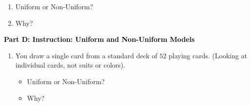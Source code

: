 \documentclass[12pt, letterpaper, fleqn]{article}
\newcommand{\blank}{\underline{\hspace{2.2cm}}}
\newcommand{\blanklong}{\underline{\hspace{6.5cm}}}
\begin{document}
\begin{enumerate}[itemsep=2.2cm, leftmargin=0.6cm, resume]
\item Uniform or Non-Uniform? \blank
\item Why? \blanklong
\end{enumerate}

\newpage

\begin{tcolorbox}[colback=customteal!20]
\large\textcolor{black}{\textbf{Part D: Instruction: Uniform and Non-Uniform Models}}
\end{tcolorbox}

\vspace{3mm}

\begin{enumerate}[itemsep=2.2cm, leftmargin=0.6cm, resume]
\item You draw a single card from a standard deck of $52$ playing cards. (Looking at individual cards, not suits or colors).
\begin{itemize}
\item Uniform or Non-Uniform? \blank
\item Why? \blanklong
\end{itemize}
\end{enumerate}
\end{document}
